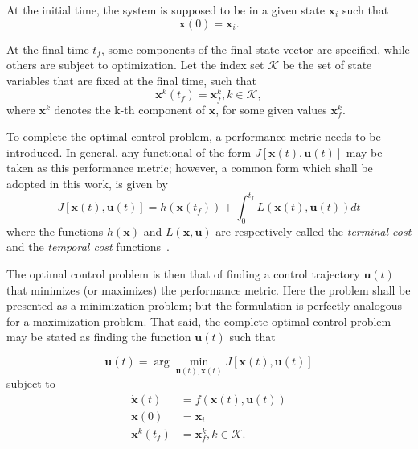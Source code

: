 At the initial time, the system is supposed to be in a given state \(\mathbf{x}_i\) such that 
\begin{equation} \label{eq:generic_initial_constraint}
    \mathbf{x}(0) = \mathbf{x}_i.
\end{equation}

At the final time \(t_f\), some components of the final state vector are specified, while others are subject to optimization. Let the index set \(\mathcal{K}\) be the set of state variables that are fixed at the final time, such that
\begin{equation} \label{eq:generic_final_constraint}
    \mathbf{x}^k(t_f) = \mathbf{x}_{f}^k, k\in \mathcal{K},
\end{equation}
where \(\mathbf{x}^k\) denotes the k-th component of \(\mathbf{x}\), for some given values \(\mathbf{x}_{f}^k\).

To complete the optimal control problem, a performance metric needs to be introduced. In general, any functional of the form \(J[\mathbf{x}(t), \mathbf{u}(t)]\) may be taken as this performance metric; however, a common form which shall be adopted in this work, is given by
\begin{equation} \label{eq:generic_cost}
    J[\mathbf{x}(t), \mathbf{u}(t)] = h(\mathbf{x}(t_f)) + \int_0^{t_f} L(\mathbf{x}(t), \mathbf{u}(t)) dt
\end{equation}
where the functions \(h(\mathbf{x})\) and \(L(\mathbf{x}, \mathbf{u})\) are respectively called the \textit{terminal cost} and the \textit{temporal cost} functions~\cite{bertsekas}.\

The optimal control problem is then that of finding a control trajectory \(\mathbf{u}(t)\) that minimizes (or maximizes) the performance metric. Here the problem shall be presented as a minimization problem; but the formulation is perfectly analogous for a maximization problem. That said, the complete optimal control problem may be stated as finding the function \(\mathbf{u}(t)\) such that~\cite{bryson_applied_optimal_control}

\begin{equation} \label{eq:argmin_cost}
    \mathbf{u}(t) = \arg \min_{\mathbf{u}(t), \mathbf{x}(t)} J[\mathbf{x}(t), \mathbf{u}(t)]
\end{equation}
subject to
\begin{align}
    \dot{\mathbf{x}}(t) &= f(\mathbf{x}(t), \mathbf{u}(t)) \\
    \mathbf{x}(0) &= \mathbf{x}_i \\
    \mathbf{x}^k(t_f) &= \mathbf{x}^k_f, k\in \mathcal{K}.
\end{align}

